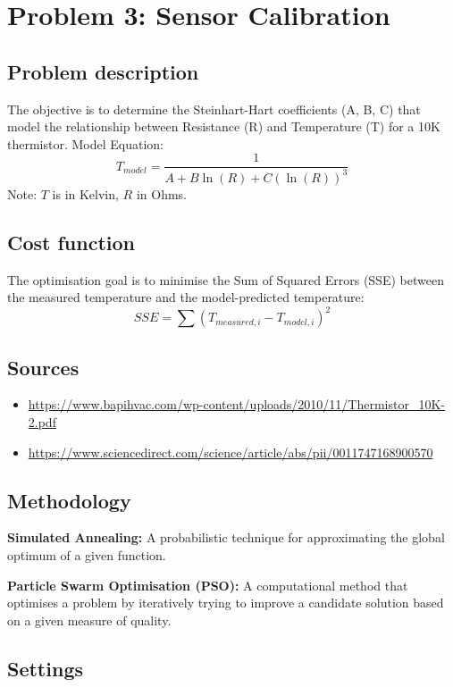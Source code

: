 \section{Problem 3: Sensor Calibration}

\subsection{Problem description}
The objective is to determine the Steinhart-Hart coefficients (A, B, C) that model the relationship between Resistance (R) and Temperature (T) for a 10K thermistor.
Model Equation: 
\begin{equation}
T_{model} = \frac{1}{A + B \ln(R) + C (\ln(R))^3}
\end{equation}
Note: $T$ is in Kelvin, $R$ in Ohms.

\subsection{Cost function}
The optimisation goal is to minimise the Sum of Squared Errors (SSE) between the measured temperature and the model-predicted temperature:
\begin{equation}
SSE = \sum (T_{measured,i} - T_{model,i})^2
\end{equation}

\subsection{Sources}
\begin{itemize}
    \item \url{https://www.bapihvac.com/wp-content/uploads/2010/11/Thermistor_10K-2.pdf}
    \item \url{https://www.sciencedirect.com/science/article/abs/pii/0011747168900570}
\end{itemize}

\subsection{Methodology}
\textbf{Simulated Annealing:} A probabilistic technique for approximating the global optimum of a given function.

\textbf{Particle Swarm Optimisation (PSO):} A computational method that optimises a problem by iteratively trying to improve a candidate solution based on a given measure of quality.

\subsection{Settings}


